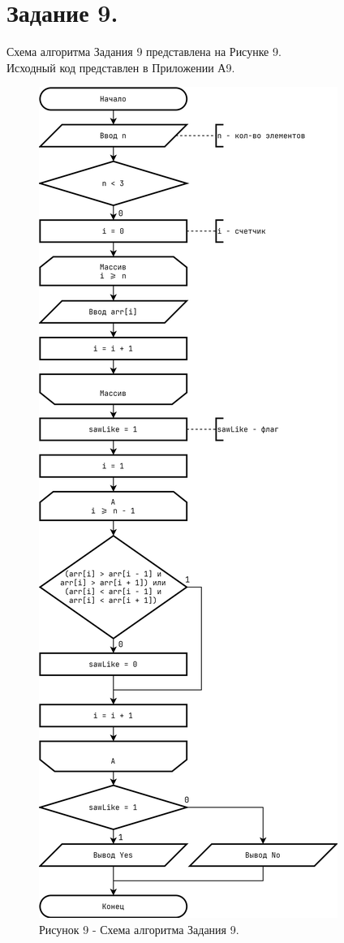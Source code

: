 \documentclass[oneside,a4paper,14pt]{extarticle}
\begin{document}
\section*{Задание 9.}
\noindent Схема алгоритма Задания 9 представлена на Рисунке 9.\\
\noindent Исходный код представлен в Приложении А9. \\
\begin{figure}[!ht]
	\centering
	\includegraphics[height=0.75\textheight]{pics/flowchart-21.png}
	\caption*{Рисунок 9 - Схема алгоритма Задания 9.}
\end{figure}
\end{document}
